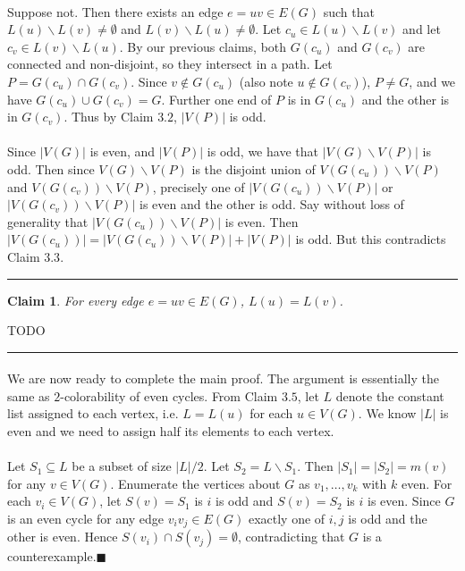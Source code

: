 \documentclass[letterpaper,12pt,oneside,onecolumn]{article}
\newenvironment{proof}{{\bf Proof:  }}{\hfill\rule{2mm}{2mm}}
\newtheorem{claim}[fact]{Claim}
\begin{document}
\begin{proof}
	\paragraph{}
	Suppose not. Then there exists an edge $e=uv \in E(G)$ such that $L(u)\backslash L(v) \neq \emptyset$ and $L(v)\backslash L(u) \neq \emptyset$. Let $c_u \in L(u) \backslash L(v)$ and let $c_v \in L(v)\backslash L(u)$. By our previous claims, both $G(c_u)$ and $G(c_v)$ are connected and non-disjoint, so they intersect in a path. Let $P = G(c_u) \cap G(c_v)$. Since $v \not\in G(c_u)$ (also note $u \not\in G(c_v)$), $P \neq G$, and we have $G(c_u) \cup G(c_v) = G$. Further one end of $P$ is in $G(c_u)$ and the other is in $G(c_v)$. Thus by Claim $3.2$, $|V(P)|$ is odd.
	\paragraph{}
	Since $|V(G)|$ is even,  and $|V(P)|$ is odd, we have that $|V(G) \backslash V(P)|$ is odd. Then since $V(G)\backslash V(P)$ is the disjoint union of $V(G(c_u))\backslash V(P)$ and $V(G(c_v)) \backslash V(P)$, precisely one of $|V(G(c_u))\backslash V(P)|$ or $|V(G(c_v))\backslash V(P)|$ is even and the other is odd. Say without loss of generality that $|V(G(c_u))\backslash V(P)|$ is even. Then $|V(G(c_u))| = |V(G(c_u))\backslash V(P)| + |V(P)|$ is odd. But this contradicts Claim $3.3$.
	\end{proof}
\begin{claim}
For every edge $e=uv \in E(G)$, $L(u) = L(v)$.
\end{claim}
\begin{proof}
	TODO
\end{proof}
\paragraph{}
We are now ready to complete the main proof. The argument is essentially the same as $2$-colorability of even cycles. From Claim $3.5$, let $L$ denote the constant list assigned to each vertex, i.e. $L = L(u)$ for each $u \in V(G)$. We know $|L|$ is even and we need to assign half its elements to each vertex.
\paragraph{}
 Let $S_1 \subseteq L$ be a subset of size $|L|/2$. Let $S_2 = L \backslash S_1$. Then $|S_1| = |S_2| = m(v)$ for any $v \in V(G)$. Enumerate the vertices about $G$ as $v_1, \dots, v_k$ with $k$ even. For each $v_i \in V(G)$, let $S(v) = S_1$ is $i$ is odd and $S(v) = S_2$ is $i$ is even. Since $G$ is an even cycle for any edge $v_iv_j \in E(G)$ exactly one of $i,j$ is odd and the other is even. Hence $S(v_i) \cap S(v_j) = \emptyset$, contradicting that $G$ is a counterexample.$\blacksquare$
\end{document}
